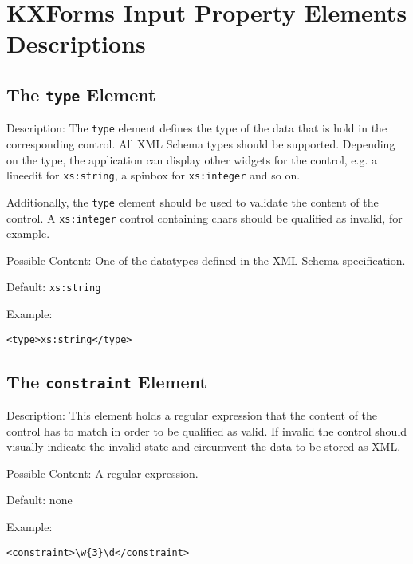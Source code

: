 



\pagebreak 
\section{ KXForms Input Property Elements Descriptions}
\label{inputpropertyelements}

\subsection{ The \texttt{type} Element}
\label{type}
\begin{description}
 \item Description: The \texttt{type} element defines the type of the data that is hold in the corresponding control. All XML Schema types should be supported. Depending on the type, the application can display other widgets for the control, e.g. a lineedit for \texttt{xs:string}, a spinbox for \texttt{xs:integer} and so on.

Additionally, the \texttt{type} element should be used to validate the content of the control. A \texttt{xs:integer} control containing chars should be qualified as invalid, for example.

 \item Possible Content: One of the datatypes defined in the XML Schema specification.

 \item Default: \texttt{xs:string}

 \item Example: 

\begin{lstlisting}[caption=\texttt{type} Element]
<type>xs:string</type>
\end{lstlisting}
\end{description}





\subsection{ The \texttt{constraint} Element}
\label{constrain}
\begin{description}
 \item Description: This element holds a regular expression that the content of the control has to match in order to be qualified as valid. If invalid the control should visually indicate the invalid state and circumvent the data to be stored as XML.

 \item Possible Content: A regular expression.

 \item Default: none

 \item Example: 

\begin{lstlisting}[caption=\texttt{contraint} Element]
<constraint>\w{3}\d</constraint>
\end{lstlisting}
\end{description}








